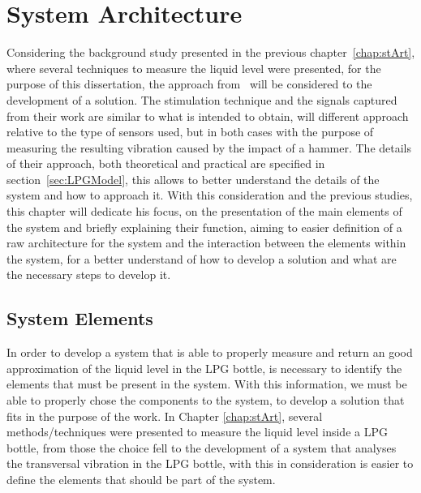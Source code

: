\cleardoublepage
\chapter{System Architecture} \label{chap:sysArch}

Considering the background study presented in the previous chapter~\ref{chap:stArt}, where several techniques to measure the liquid level were presented, for the purpose of this dissertation, the approach from~\citeauthor{wuAnalysisImplementationNoncontact2016a} will be considered to the development of a solution. The stimulation technique and the signals captured from their work are similar to what is intended to obtain, will different approach relative to the type of sensors used, but in both cases with the purpose of measuring the resulting vibration caused by the impact of a hammer. The details of their approach, both theoretical and practical are specified in section~\ref{sec:LPGModel}, this allows to better understand the details of the system and how to approach it. With this consideration and the previous studies, this chapter will dedicate his focus, on the presentation of the main elements of the system and briefly explaining their function, aiming to easier definition of a raw architecture for the system and the interaction between the elements within the system, for a better understand of how to develop a solution and what are the necessary steps to develop it.

\section{System Elements}
In order to develop a system that is able to properly measure and return an good approximation of the liquid level in the LPG bottle, is necessary to identify the elements that must be present in the system. With this information, we must be able to properly chose the components to the system, to develop a solution that fits in the purpose of the work. In Chapter \ref{chap:stArt}, several methods/techniques were presented to measure the liquid level inside a LPG bottle, from those the choice fell to the development of a system that analyses the transversal vibration in the LPG bottle, with this in consideration is easier to define the elements that should be part of the system. 
